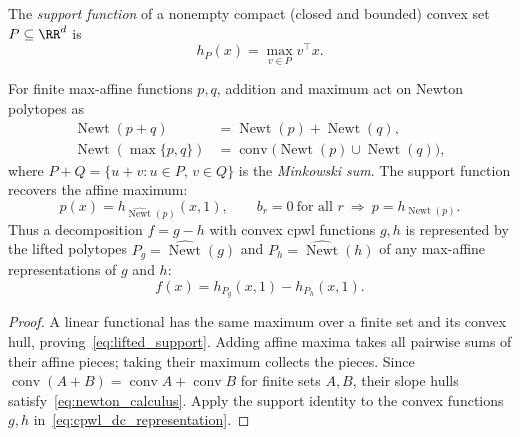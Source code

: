\begin{definition}\label{def:support_function}
The \emph{support function} of a nonempty compact (closed and bounded) convex set $P\subseteq\RR^d$ is
\begin{equation}
    h_P(x)=\max_{v\in P}v^\top x.
    \label{eq:support_function}
\end{equation}
\end{definition}

\begin{proposition}\label{prop:dc_polytope_representation}
For finite max-affine functions $p,q$, addition and maximum act on Newton polytopes as
\begin{equation}
\begin{aligned}
    \operatorname{Newt}(p+q)&=\operatorname{Newt}(p)+\operatorname{Newt}(q),\\
    \operatorname{Newt}(\max\{p,q\})&=\operatorname{conv}\bigl(\operatorname{Newt}(p)\cup\operatorname{Newt}(q)\bigr),
\end{aligned}
    \label{eq:newton_calculus}
\end{equation}
where $P+Q=\{u+v:u\in P,\,v\in Q\}$ is the \emph{Minkowski sum}. The support function recovers the affine maximum:
\begin{equation}
    p(x)=h_{\widehat{\operatorname{Newt}}(p)}(x,1),
    \qquad b_r=0\ \text{for all }r\ \Longrightarrow\ p=h_{\operatorname{Newt}(p)}.
    \label{eq:lifted_support}
\end{equation}
Thus a decomposition $f=g-h$ with convex \ac{cpwl} functions $g,h$ is represented by the lifted polytopes $P_g=\widehat{\operatorname{Newt}}(g)$ and $P_h=\widehat{\operatorname{Newt}}(h)$ of any max-affine representations of $g$ and $h$:
\begin{equation}
    f(x)=h_{P_g}(x,1)-h_{P_h}(x,1).
    \label{eq:dc_polytope_representation}
\end{equation}
\end{proposition}

\begin{proof}
A linear functional has the same maximum over a finite set and its convex hull, proving~\eqref{eq:lifted_support}. Adding affine maxima takes all pairwise sums of their affine pieces; taking their maximum collects the pieces. Since $\operatorname{conv}(A+B)=\operatorname{conv}A+\operatorname{conv}B$ for finite sets $A,B$, their slope hulls satisfy~\eqref{eq:newton_calculus}. Apply the support identity to the convex functions $g,h$ in~\eqref{eq:cpwl_dc_representation}.
\end{proof}

